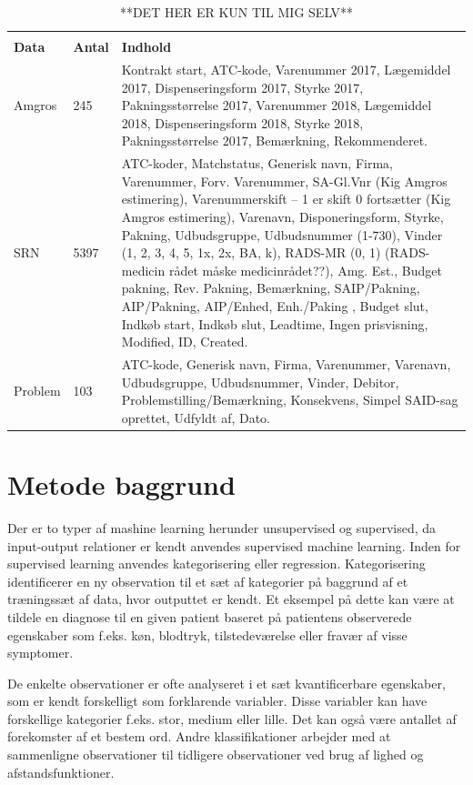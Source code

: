 \vspace{2mm}
\begin{longtable}{p{2.5cm}|p{1cm}|p{11cm}}
	\caption{**DET HER ER KUN TIL MIG SELV**}
	\vspace{2mm}
	\label{table:XXX} \\
\cellcolor[HTML]{C0C0C0} {\textbf{Data}} & {\cellcolor[HTML]{C0C0C0}\textbf{Antal}} & 
{\cellcolor[HTML]{C0C0C0}\textbf{Indhold}} \\ \hline
Amgros & 245 & Kontrakt start, ATC-kode, Varenummer 2017, Lægemiddel 2017, Dispenseringsform 2017, Styrke 2017, Pakningsstørrelse 2017, Varenummer 2018, Lægemiddel 2018, Dispenseringsform 2018, Styrke 2018, Pakningsstørrelse 2017, Bemærkning, Rekommenderet.\\ \hline
SRN & 5397 & ATC-koder, Matchstatus, Generisk navn, Firma, Varenummer, Forv. Varenummer, SA-Gl.Vnr (Kig Amgros estimering), Varenummerskift – 1 er skift 0 fortsætter (Kig Amgros estimering), Varenavn, Disponeringsform, Styrke, Pakning, Udbudsgruppe, Udbudsnummer (1-730), Vinder (1, 2, 3, 4, 5, 1x, 2x, BA, k), RADS-MR (0, 1) (RADS- medicin rådet måske medicinrådet??), Amg. Est., Budget pakning, Rev. Pakning, Bemærkning, SAIP/Pakning, AIP/Pakning,
AIP/Enhed, Enh./Paking , Budget slut, Indkøb start, Indkøb slut, Leadtime, Ingen prisvisning, Modified, ID, Created.\\ \hline
Problem & 103 & ATC-kode, Generisk navn, Firma, Varenummer, Varenavn, Udbudsgruppe, Udbudsnummer, Vinder, Debitor, Problemstilling/Bemærkning, Konsekvens, Simpel SAID-sag oprettet, Udfyldt af, Dato. \\ \hline
\end{longtable}



\section{Metode baggrund}
Der er to typer af mashine learning herunder unsupervised og supervised, da input-output relationer er kendt anvendes supervised machine learning. Inden for supervised learning anvendes kategorisering eller regression. Kategorisering identificerer en ny observation til et sæt af kategorier på baggrund af et træningssæt af data, hvor outputtet er kendt. Et eksempel på dette kan være at tildele en diagnose til en given patient baseret på patientens observerede egenskaber som f.eks. køn, blodtryk, tilstedeværelse eller fravær af visse symptomer. 

De enkelte observationer er ofte analyseret i et sæt kvantificerbare egenskaber, som er kendt forskelligt som forklarende variabler. Disse variabler kan have forskellige kategorier f.eks. stor, medium eller lille. Det kan også være antallet af forekomster af et  bestem ord. Andre klassifikationer arbejder med at sammenligne observationer til tidligere observationer ved brug af lighed og afstandsfunktioner.

